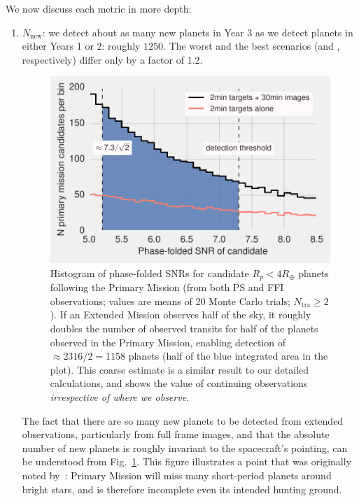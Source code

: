We now discuss each metric in more depth:
\begin{enumerate}
	\item $N_\mathrm{new}$: we detect about as many new planets in Year 3 as we detect planets in either Years 1 or 2: roughly $1250$.
	The worst and the best scenarios (\elong\:and \hemis, respectively) differ 
	only by a factor of 1.2.
	\begin{figure}[!t]
		\centering
		\includegraphics[scale=1.]{figures/snrf_histogram_with_ps.pdf}
		\caption{Histogram of phase-folded SNRs for candidate $R_p<4R_\oplus$ 
		planets following the Primary Mission (from both PS and FFI 
		observations; values are means of 20 Monte Carlo trials; 
		$N_\mathrm{tra}\geq2$).
			If an Extended Mission observes half of the sky, it roughly doubles 
			the number of observed transits for half of the planets observed in 
			the Primary Mission, enabling detection of $\approx 2316/2 = 1158$ 
			planets (half of the blue integrated area in the plot). This coarse 
			estimate is a similar result to our detailed calculations, and 
			shows the value of continuing \tesss observations 
			\textit{irrespective of where we observe}.}
		\label{fig:snrf_histogram}
	\end{figure}
	The fact that there are so many new planets to be detected from extended observations, particularly from full frame images, and that the absolute number of new planets is roughly invariant to the spacecraft's pointing, can be understood from Fig.~\ref{fig:snrf_histogram}.
	This figure illustrates a point that was originally noted by~:
        \tesss Primary Mission will miss many short-period planets around bright stars, and is therefore
        incomplete even its intended hunting ground.

\end{enumerate}
